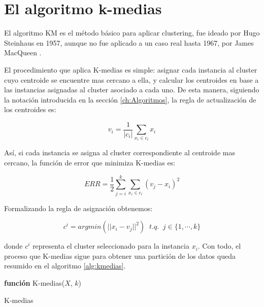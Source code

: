 \chapter{El algoritmo k-medias}\label{ap:kmeans}

El algoritmo \acf{KM} es el método básico para aplicar clustering, fue ideado por  Hugo Steinhaus en 1957, aunque no fue aplicado a un caso real hasta 1967, por James MacQueen \cite{KMEANS:1967}. 

El procedimiento que aplica K-medias es simple: asignar cada instancia al cluster cuyo centroide se encuentre mas cercano a ella, y calcular los centroides en base a las instancias asignadas al cluster asociado a cada uno. De esta manera, siguiendo la notación introducida en la sección \ref{ch:Algoritmos}, la regla de actualización de los centroides es:

\begin{equation}
v_i = \frac{1}{|c_i|} \sum_{x_i \in c_i} x_i
\label{a1}
\end{equation}

Así, si cada instancia se asigna al cluster correspondiente al centroide mas cercano, la función de error que minimiza K-medias es:

\begin{equation}
ERR = \frac{1}{2} \sum_{j = i}^{k} \sum_{x_i \in c_i} (v_j - x_i)^2
\label{a2}
\end{equation}

Formalizando la regla de asignación obtenemos:

\begin{equation}
c^i = argmin(||x_i - v_j||^2) \;\; t.q. \;\; j \in \{1, \cdots, k\}
\label{a3}
\end{equation}

donde $c^i$ representa el cluster seleccionado para la instancia $x_i$. Con todo, el proceso que K-medias sigue para obtener una partición de los datos queda resumido en el algoritmo \ref{alg:kmedias}.

\begin{algorithm}
	
	\BlankLine
	\BlankLine
	\textbf{función} K-medias($X$, $k$) 
	\BlankLine
	\caption{K-medias}
	\label{alg:kmedias}
\end{algorithm}


